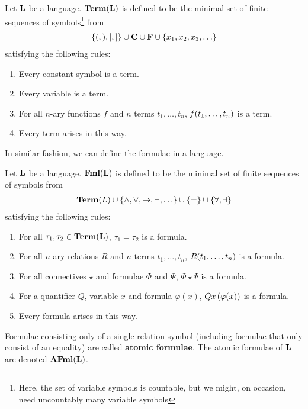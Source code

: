 \begin{boxdefinition}[Terms]
    Let $\mathbf{L}$ be a language. $\mathbf{Term}(\mathbf{L})$ is defined to be the minimal set of finite sequences of symbols\footnote{Here, the set of variable symbols is countable, but we might, on occasion, need uncountably many variable symbols} from
    \begin{align*}
        \left\{ (, ), [, ] \right\} \cup \mathbf{C} \cup \mathbf{F} \cup \left\{ x_1, x_2, x_3, \ldots \right\}
    \end{align*}
    satisfying the following rules:
    \begin{enumerate}
        \item Every constant symbol is a term.
        \item Every variable is a term.
        \item For all $n$-ary functions $f$ and $n$ terms $t_1, \ldots, t_n$, $f\!\left( t_1, \ldots, t_n \right)$ is a term.
        \item Every term arises in this way.
    \end{enumerate}
\end{boxdefinition}


In similar fashion, we can define the formulae in a language.

\begin{boxdefinition}[Formulae]
    Let $\mathbf{L}$ be a language. $\mathbf{Fml}(\mathbf{L})$ is defined to be the minimal set of finite sequences of symbols from
    \begin{align*}
        \mathbf{Term}\!\left( L \right) \cup \left\{ \land, \lor, \to, \neg, \ldots \right\} \cup \left\{ = \right\} \cup \left\{ \forall, \exists \right\}
    \end{align*}
    satisfying the following rules:
    \begin{enumerate}
        \item For all $\tau_1, \tau_2 \in \mathbf{Term}\!\left( \mathbf{L} \right)$, $\tau_1 = \tau_2$ is a formula.
        \item For all $n$-ary relations $R$ and $n$ terms $t_1, \ldots, t_n$, $R\!\left( t_1, \ldots, t_n \right)$ is a formula.
        \item For all connectives $\star$ and formulae $\Phi$ and $\Psi$, $\Phi \star \Psi$ is a formula.
        \item For a quantifier $Q$, variable $x$ and formula $\varphi(x)$, $Qx \left( \varphi\!\left( x \right) \right)$ is a formula.
        \item Every formula arises in this way.
    \end{enumerate}
    Formulae consisting only of a single relation symbol (including formulae that only consist of an equality) are called \textbf{atomic formulae}. The atomic formulae of $\mathbf{L}$ are denoted $\mathbf{AFml}(\mathbf{L})$.
\end{boxdefinition}

